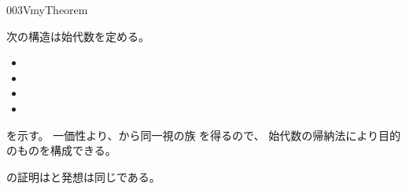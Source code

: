 \documentclass[index]{subfiles}
\begin{document}
\begin{myBlock}{003V}{myTheorem}
\begin{enumerate}
    次の構造は始代数を定める。
    \begin{itemize}
    \item {}
    \item {}
    \item {}
    \item {}
    \end{itemize}
  \end{enumerate}
\end{myBlock}
\begin{myProof}
  を示す。
  一価性より、から同一視の族
  を得るので、
  始代数の帰納法により目的のものを構成できる。

  の証明はと発想は同じである。
\end{myProof}
\end{document}
